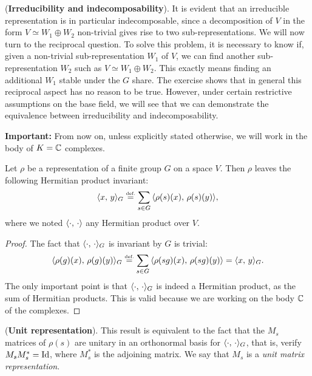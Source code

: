  
\begin{rem}{(\upshape \textbf{Irreducibility and indecomposability}).}
It is evident that an irreducible representation is in particular indecomposable, since a decomposition of $V$ in the form $ V \simeq W_1 \oplus W_2 $ non-trivial gives rise to two sub-representations. We will now turn to the reciprocal question. To solve this problem, it is necessary to know if, given a non-trivial sub-representation $ W_1 $ of $V$, we can find another sub-representation $ W_2 $ such as $ V \simeq W_1 \oplus W_2 $. This exactly means finding an additional $ W_1 $ stable under the $G$ share. The exercise  shows that in general this reciprocal aspect has no reason to be true. However, under certain restrictive assumptions on the base field, we will see that we can demonstrate the equivalence between irreducibility and indecomposability.
\end{rem}
 
\noindent \textbf{Important:} From now on, unless explicitly stated otherwise, we will work in the body of $ K = \mathbb{C} $ complexes.
 
\begin{prop}
\label{unit-representation-prop}
  Let $ \rho $ be a representation of a finite group $G$ on a space $V$. Then $ \rho $ leaves the following Hermitian product invariant:
\begin{equation*}
\langle x,\,y\rangle_G \stackrel{\mbox{\upshape\tiny def.}}{=} \sum_{s \in G}{\langle \rho (s) (x),\,\rho (s) (y)\rangle},
\end{equation*}
where we noted $ \langle \cdot,\,\cdot\rangle $ any Hermitian product over $V$.
\end{prop}
\begin{proof}
The fact that $ \langle \cdot,\,\cdot\rangle_G $ is invariant by $G$ is trivial:
\begin{equation*}
\langle \rho (g) (x),\,\rho (g) (y)\rangle_G \stackrel{\mbox{\upshape\tiny def.}}{=} \sum_{s \in G}{\langle \rho (sg) (x),\,\rho ( sg) (y)\rangle} = \langle x,\,y\rangle_G.
\end{equation*}
The only important point is that $ \langle \cdot,\,\cdot\rangle_G $ is indeed a Hermitian product, as the sum of Hermitian products. This is valid because we are working on the body $ \mathbb{C} $ of the complexes.
\end{proof}
 
 
\begin{rem}{(\upshape \textbf{Unit representation}).}
   This result is equivalent to the fact that the $ M_s $ matrices of $ \rho (s) $ are unitary in an orthonormal basis for $ \langle \cdot,\,\cdot\rangle_G $, that is, verify $ M_s M_s^* = \operatorname{Id} $, where $ M_s^* $ is the adjoining matrix. We say that $ M_s $ is a \textit{unit matrix representation}.
\end{rem}
 
